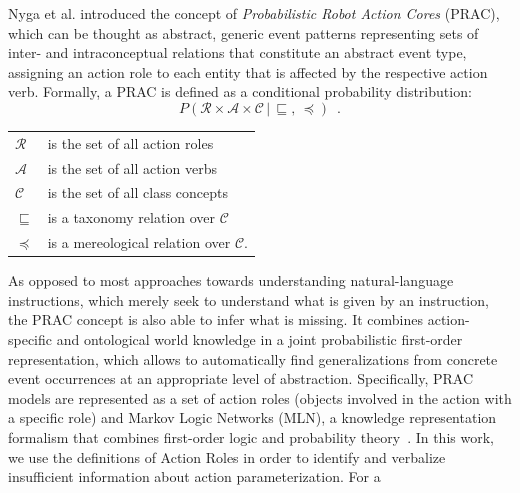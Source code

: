 \documentclass[oribibl]{llncs}
\begin{document}
Nyga et al.\cite{nyga12actioncore} introduced the concept of 
\emph{Probabilistic Robot Action Cores} (PRAC), which can be thought as abstract,
generic event patterns representing sets of 
inter- and intraconceptual relations that constitute an abstract 
event type, assigning an action role to each entity that is affected 
by the respective action verb. Formally, a PRAC is defined as a conditional
probability distribution:
\begin{equation}
P\left(\mathcal{R}\times\mathcal{A}\times\mathcal{C}\,|\,\sqsubseteq
,\, \preceq \right)\nonumber \enspace .
\end{equation}
{\small
\begin{center} \begin{tabular}{ll}
    $\mathcal{R}$  & is the set of all action roles\\
    $\mathcal{A}$  & is the set of all action verbs\\
    $\mathcal{C}$  & is the set of all class concepts\\
    $\sqsubseteq$ & is a taxonomy relation over $\mathcal{C}$\\
    $\preceq$	& is a mereological relation over $\mathcal{C}$.
\end{tabular}
\end{center}}
As opposed to most approaches towards understanding natural-language 
instructions, which merely seek to understand what is given by an 
instruction, the PRAC concept is also able to infer what is missing. 
It combines action-specific and ontological world knowledge in a 
joint probabilistic first-order representation, which allows to 
automatically find generalizations from concrete event occurrences 
at an appropriate level of abstraction. Specifically, PRAC models 
are represented as a set of action roles (objects involved in the 
action with a specific role) and Markov Logic Networks (MLN), a 
knowledge representation formalism that combines first-order logic 
and probability theory~\cite{DBLP:journals/ml/RichardsonD06}. In this
work, we use the definitions of Action Roles in order to identify and
verbalize insufficient information about action parameterization. For a 
\end{document}
